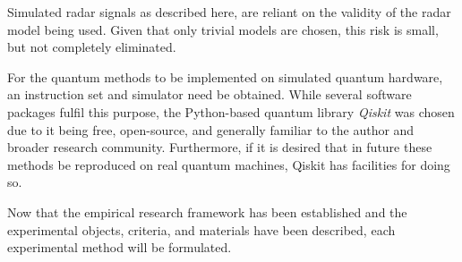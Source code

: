 Simulated radar signals as described here, are reliant on the validity of the radar model being used.
Given that only trivial models are chosen, this risk is small, but not completely eliminated.

For the quantum methods to be implemented on simulated quantum hardware, an instruction set and simulator need be obtained. 
While several software packages fulfil this purpose, the Python-based quantum library \textit{Qiskit} \cite{qiskit_contributors_qiskit_2023} was chosen due to it being free, open-source, and generally familiar to the author and broader research community\cite{garhwal_quantum_2021}.
Furthermore, if it is desired that in future these methods be reproduced on real quantum machines, Qiskit has facilities for doing so.

Now that the empirical research framework has been established and the experimental objects, criteria, and materials have been described, each experimental method will be formulated.
